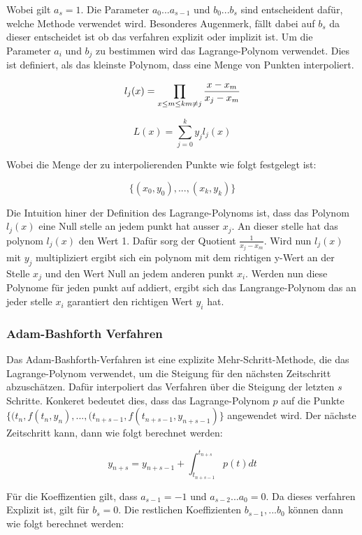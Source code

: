 Wobei gilt $a_s= 1$.  Die Parameter $a_0 ... a_{s-1}$ und $b_0 ... b_{s}$ sind entscheident dafür, welche Methode verwendet wird.
Besonderes Augenmerk, fällt dabei auf $b_s$ da dieser entscheidet ist ob das verfahren explizit oder implizit ist.
Um die Parameter $a_i$ und $b_j$ zu bestimmen wird das Lagrange-Polynom verwendet.
Dies ist definiert, als das kleinste Polynom, dass eine Menge von Punkten interpoliert.

$$
l_j(x) = \prod_{x \leq m \leq k \\ m \neq j} \frac{x - x_m}{x_j - x_m}
$$

$$
L(x) = \sum_{j = 0}^{k} y_j l_j(x)
$$

Wobei die Menge der zu interpolierenden Punkte wie folgt festgelegt ist:

$$
\{(x_0, y_0), ..., (x_k, y_k)\}
$$

Die Intuition hiner der Definition des Lagrange-Polynoms ist, 
dass das Polynom $l_j(x)$ eine Null stelle an jedem punkt hat ausser $x_j$. 
An dieser stelle hat das polynom $l_j(x)$ den Wert 1.
Dafür sorg der Quotient $\frac{1}{x_j - x_m}$.
Wird nun $l_j(x)$ mit $y_j$ multipliziert ergibt sich ein polynom mit dem richtigen y-Wert an der Stelle $x_j$ und den Wert Null an jedem anderen punkt $x_i$.
Werden nun diese Polynome für jeden punkt auf addiert,
ergibt sich das Langrange-Polynom das an jeder stelle $x_i$ garantiert den richtigen Wert $y_i$ hat.


\subsubsection{Adam-Bashforth Verfahren} \label{sec:adam-bashforth}

Das Adam-Bashforth-Verfahren ist eine explizite Mehr-Schritt-Methode, 
die das Lagrange-Polynom verwendet, 
um die Steigung für den nächsten Zeitschritt abzuschätzen. 
Dafür interpoliert das Verfahren über die Steigung der letzten $s$ Schritte.
Konkeret bedeutet dies, dass das Lagrange-Polynom $p$ auf die Punkte $\{(t_{n}, f(t_{n}, y_{n}), ..., (t_{n + s - 1}, f(t_{n + s - 1}, y_{n + s - 1})\}$ angewendet wird.
Der nächste Zeitschritt kann, dann wie folgt berechnet werden:

$$
y_{n + s} = y_{n + s -1} + \int_{t_{n+s-1}}^{t_{n + s}} p(t) dt
$$

Für die Koeffizentien gilt, dass $a_{s-1} = -1$ und $a_{s-2} ... a_{0} = 0$. 
Da dieses verfahren Explizit ist, gilt für $b_s = 0$. Die restlichen Koeffizienten $b_{s-1}, ... b_{0}$
können dann wie folgt berechnet werden:

